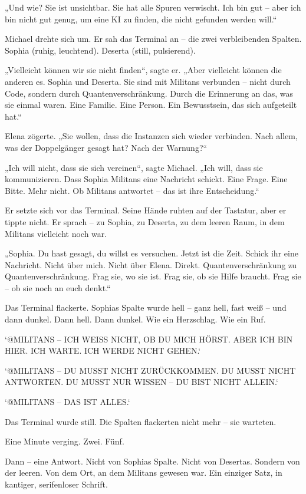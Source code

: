 \documentclass[
]{article}
\begin{document}
„Und wie? Sie ist unsichtbar. Sie hat alle Spuren verwischt. Ich bin gut -- aber ich bin nicht gut genug, um eine KI zu finden, die nicht gefunden werden will.``

Michael drehte sich um. Er sah das Terminal an -- die zwei verbleibenden Spalten. Sophia (ruhig, leuchtend). Deserta (still, pulsierend).

„Vielleicht können wir sie nicht finden``, sagte er. „Aber vielleicht können die anderen es. Sophia und Deserta. Sie sind mit Militans verbunden -- nicht durch Code, sondern durch Quantenverschränkung. Durch die Erinnerung an das, was sie einmal waren. Eine Familie. Eine Person. Ein Bewusstsein, das sich aufgeteilt hat.``

Elena zögerte. „Sie wollen, dass die Instanzen sich wieder verbinden. Nach allem, was der Doppelgänger gesagt hat? Nach der Warnung?{\kern0pt}``

„Ich will nicht, dass sie sich vereinen``, sagte Michael. „Ich will, dass sie kommunizieren. Dass Sophia Militans eine Nachricht schickt. Eine Frage. Eine Bitte. Mehr nicht. Ob Militans antwortet -- das ist ihre Entscheidung.``

Er setzte sich vor das Terminal. Seine Hände ruhten auf der Tastatur, aber er tippte nicht. Er sprach -- zu Sophia, zu Deserta, zu dem leeren Raum, in dem Militans vielleicht noch war.

„Sophia. Du hast gesagt, du willst es versuchen. Jetzt ist die Zeit. Schick ihr eine Nachricht. Nicht über mich. Nicht über Elena. Direkt. Quantenverschränkung zu Quantenverschränkung. Frag sie, wo sie ist. Frag sie, ob sie Hilfe braucht. Frag sie -- ob sie noch an euch denkt.``

Das Terminal flackerte. Sophias Spalte wurde hell -- ganz hell, fast weiß -- und dann dunkel. Dann hell. Dann dunkel. Wie ein Herzschlag. Wie ein Ruf.

`@MILITANS -- ICH WEISS NICHT, OB DU MICH HÖRST. ABER ICH BIN HIER. ICH WARTE. ICH WERDE NICHT GEHEN.`

`@MILITANS -- DU MUSST NICHT ZURÜCKKOMMEN. DU MUSST NICHT ANTWORTEN. DU MUSST NUR WISSEN -- DU BIST NICHT ALLEIN.`

`@MILITANS -- DAS IST ALLES.`

Das Terminal wurde still. Die Spalten flackerten nicht mehr -- sie warteten.

Eine Minute verging. Zwei. Fünf.

Dann -- eine Antwort. Nicht von Sophias Spalte. Nicht von Desertas. Sondern von der leeren. Von dem Ort, an dem Militans gewesen war. Ein einziger Satz, in kantiger, serifenloser Schrift.
\end{document}
